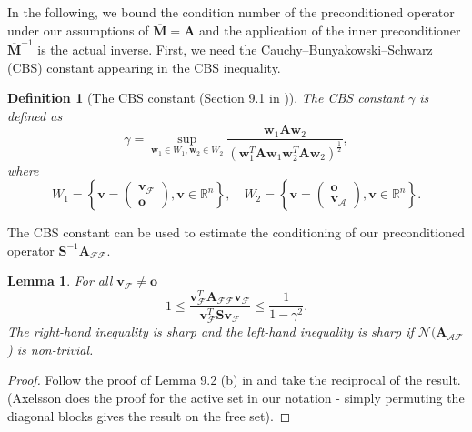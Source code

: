 \documentclass[11pt]{article}
\theoremstyle{plain}
\newtheorem{lemma}[theorem]{Lemma}
\newtheorem{definition}[theorem]{Definition}
\theoremstyle{definition}
\newcommand{\Vo}{\bm{o}}
\newcommand{\Vv}{\bm{v}}
\newcommand{\Vw}{\bm{w}}
\newcommand{\MA}{\bm{A}}
\newcommand{\MM}{\bm{M}}
\newcommand{\MS}{\bm{S}}
\begin{document}
In the following, we bound the condition number of the preconditioned operator under our assumptions of $\overline{\MM} = \MA$ and the application of the inner preconditioner $\overline{\MM}^{-1}$ is the actual inverse. First, we need the Cauchy--Bunyakowski--Schwarz (CBS) constant appearing in the CBS inequality.
\begin{definition}[The CBS constant (Section 9.1 in \cite{Axelsson96})]
  \label{theo:cbs}
  The CBS constant $\gamma$ is defined as
  \begin{equation*}
    \gamma = \sup_{\Vw_1 \in W_1, \Vw_2 \in W_2} \frac{\Vw_1 \MA \Vw_2}{\left(\Vw_1^{T}\MA\Vw_1 \Vw_2^{T}\MA\Vw_2\right)^{\frac{1}{2}}},
  \end{equation*}
  where
  \begin{equation*}
    W_1 = \left\{ \Vv = \begin{pmatrix} \Vv_\mathcal{F}\\ \Vo  \end{pmatrix}, \Vv \in \mathbb{R}^{n} \right\}, \quad W_2 = \left\{ \Vv = \begin{pmatrix} \Vo \\ \Vv_\mathcal{A}  \end{pmatrix}, \Vv \in \mathbb{R}^{n} \right\}.
  \end{equation*}
\end{definition}

The CBS constant can be used to estimate the conditioning of our preconditioned operator $\MS^{-1}\MA_{\mathcal{FF}}$.
  \begin{lemma}
    \label{theo:schurcond}
    For all $\Vv_{\mathcal{F}} \neq \Vo$
    \begin{equation*}
      1 \leq \frac{\Vv_{\mathcal{F}}^{T} \MA_{\mathcal{FF}} \Vv_{\mathcal{F}}}{\Vv_{\mathcal{F}}^{T} \MS \Vv_{\mathcal{F}}} \leq \frac{1}{1-\gamma^{2}}.
    \end{equation*}
    The right-hand inequality is sharp and the left-hand inequality is sharp if $\mathcal{N}(\MA_{\mathcal{AF}}$) is non-trivial.
  \end{lemma}
  \begin{proof}
    Follow the proof of Lemma 9.2 (b) in \cite{Axelsson96} and take the reciprocal of the result. (Axelsson does the proof for the active set in our notation - simply permuting the diagonal blocks gives the result on the free set).
  \end{proof}
\end{document}

